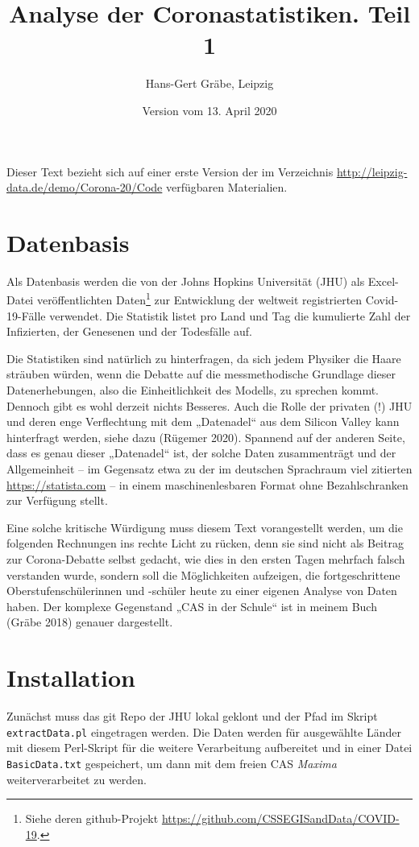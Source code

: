 \documentclass[a4paper,11pt]{article}
\title{Analyse der Coronastatistiken. Teil 1}
\author{Hans-Gert Gräbe, Leipzig}
\date{Version vom 13. April 2020}
\begin{document}
\maketitle

Dieser Text bezieht sich auf einer erste Version der im Verzeichnis
\url{http://leipzig-data.de/demo/Corona-20/Code} verfügbaren Materialien.

\section{Datenbasis}

Als Datenbasis werden die von der Johns Hopkins Universität (JHU) als
Excel-Datei veröffentlichten Daten\footnote{Siehe deren github-Projekt
  \url{https://github.com/CSSEGISandData/COVID-19}.} zur Entwicklung der
weltweit registrierten Covid-19-Fälle verwendet. Die Statistik listet pro Land
und Tag die kumulierte Zahl der Infizierten, der Genesenen und der Todesfälle
auf.

Die Statistiken sind natürlich zu hinterfragen, da sich jedem Physiker die
Haare sträuben würden, wenn die Debatte auf die messmethodische Grundlage
dieser Datenerhebungen, also die Einheitlichkeit des Modells, zu sprechen
kommt.  Dennoch gibt es wohl derzeit nichts Besseres. Auch die Rolle der
privaten (!)  JHU und deren enge Verflechtung mit dem „Datenadel“ aus dem
Silicon Valley kann hinterfragt werden, siehe dazu (Rügemer 2020).  Spannend
auf der anderen Seite, dass es genau dieser „Datenadel“ ist, der solche Daten
zusammenträgt und der Allgemeinheit -- im Gegensatz etwa zu der im deutschen
Sprachraum viel zitierten \url{https://statista.com} -- in einem
maschinenlesbaren Format ohne Bezahlschranken zur Verfügung stellt.

Eine solche kritische Würdigung muss diesem Text vorangestellt werden, um die
folgenden Rechnungen ins rechte Licht zu rücken, denn sie sind nicht als
Beitrag zur Corona-Debatte selbst gedacht, wie dies in den ersten Tagen
mehrfach falsch verstanden wurde, sondern soll die Möglichkeiten aufzeigen,
die fortgeschrittene Oberstufenschülerinnen und -schüler heute zu einer
eigenen Analyse von Daten haben.  Der komplexe Gegenstand „CAS in der Schule“
ist in meinem Buch (Gräbe 2018) genauer dargestellt. 

\section{Installation} 

Zunächst muss das git Repo der JHU lokal geklont und der Pfad im Skript
\texttt{extractData.pl} eingetragen werden.  Die Daten werden für ausgewählte
Länder mit diesem Perl-Skript für die weitere Verarbeitung aufbereitet und in
einer Datei \texttt{BasicData.txt} gespeichert, um dann mit dem freien CAS
\emph{Maxima} weiterverarbeitet zu werden.
\end{document}
